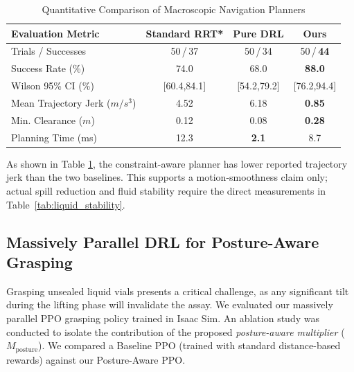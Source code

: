 \begin{table}[!t]
\renewcommand{\arraystretch}{1.3}
\caption{Quantitative Comparison of Macroscopic Navigation Planners}
\label{tab:navigation_metrics}
\centering
\begin{tabular}{lccc}
\hline\hline
\textbf{Evaluation Metric} & \textbf{Standard RRT*} & \textbf{Pure DRL} & \textbf{Ours} \\ \hline
Trials / Successes & 50\,/\,37 & 50\,/\,34 & 50\,/\,\textbf{44} \\
Success Rate (\%) & 74.0 & 68.0 & \textbf{88.0} \\
Wilson 95\% CI (\%) & [60.4,84.1] & [54.2,79.2] & [76.2,94.4] \\
Mean Trajectory Jerk ($m/s^3$) & 4.52 & 6.18 & \textbf{0.85} \\
Min. Clearance ($m$) & 0.12 & 0.08 & \textbf{0.28} \\
Planning Time (ms) & 12.3 & \textbf{2.1} & 8.7 \\ \hline\hline
\end{tabular}
\end{table}

As shown in Table \ref{tab:navigation_metrics}, the constraint-aware planner has lower reported trajectory jerk than the two baselines. This supports a motion-smoothness claim only; actual spill reduction and fluid stability require the direct measurements in Table~\ref{tab:liquid_stability}.

\subsection{Massively Parallel DRL for Posture-Aware Grasping}
\label{subsec:exp_rl_grasping}

Grasping unsealed liquid vials presents a critical challenge, as any significant tilt during the lifting phase will invalidate the assay. We evaluated our massively parallel PPO grasping policy trained in Isaac Sim. An ablation study was conducted to isolate the contribution of the proposed \textit{posture-aware multiplier} ($M_{\text{posture}}$). We compared a Baseline PPO (trained with standard distance-based rewards) against our Posture-Aware PPO.

